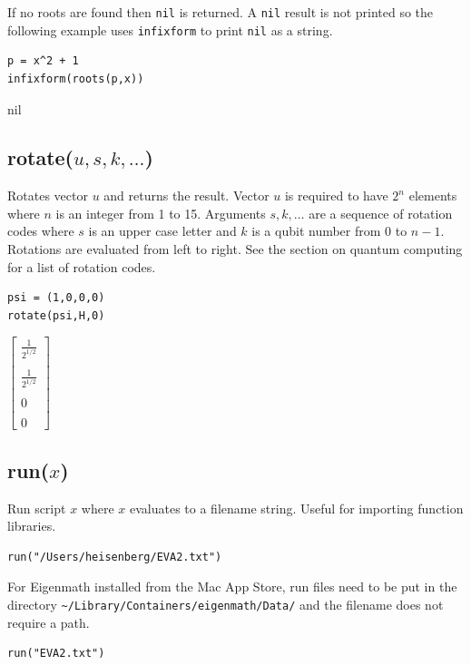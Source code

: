 \documentclass[12pt]{article}
\begin{document}
\bigskip
\noindent
If no roots are found then \verb$nil$ is returned.
A \verb$nil$ result is not printed so the following example uses
\verb$infixform$ to print \verb$nil$ as a string.

{\color{blue}
\begin{verbatim}
p = x^2 + 1
infixform(roots(p,x))
\end{verbatim}
}

\noindent
nil

\subsection*{rotate($u,s,k,\ldots$)}
Rotates vector $u$ and returns the result.
Vector $u$ is required to have $2^n$ elements where
$n$ is an integer from 1 to 15.
Arguments $s,k,\ldots$ are a sequence of rotation codes
where $s$ is an upper case letter and $k$ is a qubit number
from 0 to $n-1$.
Rotations are evaluated from left to right.
See the section on quantum computing for a list of rotation codes.

{\color{blue}
\begin{verbatim}
psi = (1,0,0,0)
rotate(psi,H,0)
\end{verbatim}
}

\noindent
$\displaystyle
\begin{bmatrix}
{\displaystyle \frac{1}{2^{1/2}}}
\\
\\
{\displaystyle \frac{1}{2^{1/2}}}
\\
\\
0
\\
\\
0
\end{bmatrix}
$

\subsection*{run($x$)}

Run script $x$ where $x$ evaluates to a filename string.
Useful for importing function libraries.

{\color{blue}
\begin{verbatim}
run("/Users/heisenberg/EVA2.txt")
\end{verbatim}
}

For Eigenmath installed from the Mac App Store,
run files need to be put in the directory
\verb$~/Library/Containers/eigenmath/Data/$
and the filename does not require a path.

{\color{blue}
\begin{verbatim}
run("EVA2.txt")
\end{verbatim}
}
\end{document}

